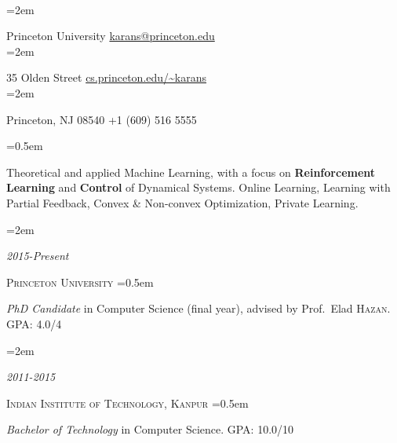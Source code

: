 \documentclass{scrartcl}
\date{}
\newlength{\datebox}\settowidth{\datebox}{Spring 2011} %
\newcommand{\NewEntry}[3]{\noindent\hangindent=2em\hangafter=0 \parbox{\datebox}{\small \textit{#1}}\hspace{1.5em} #2 #3 %
\vspace{0.5em}} %
\newcommand{\Description}[1]{\hangindent=0.5em\hangafter=0\noindent\raggedright\footnotesize{#1}\par\normalsize\vspace{1em}} %
\newcommand{\IndentLine}{\hangindent=2em\hangafter=0\noindent\raggedright}
\begin{document}
\thispagestyle{empty} %

\begin{cv}{}\vspace{1.0em} %

\hspace{-3.0em}\noindent{}
{\small
\\ %
{\IndentLine Princeton University \hfill \Letter\href{mailto:karans@princeton.edu}{karans@princeton.edu}\\ \IndentLine 35 Olden Street \hfill \Mundus\href{http://cs.princeton.edu/~karans}{cs.princeton.edu/\textasciitilde karans} \\
\IndentLine Princeton, NJ 08540 \hfill \Mobilefone +1 (609) 516 5555\\}}

\vspace{0.7em} 

\noindent{}

\Description{Theoretical and applied Machine Learning, with a focus on \textbf {Reinforcement Learning} and \textbf{Control} of Dynamical Systems. Online Learning, Learning with Partial Feedback, Convex \& Non-convex Optimization, Private Learning. }



\NewEntry{2015-Present}{\textsc{\color{Maroon} Princeton University}}

\vspace{-0.4em}\hspace{1.0em}
\Description{\textit{PhD Candidate} in Computer Science (final year), advised by Prof.~Elad \textsc{Hazan}. \hfill GPA: 4.0/4
}

\vspace{-0.5em}
\NewEntry{2011-2015}{\textsc{\color{Maroon} Indian Institute of Technology, Kanpur}}

\vspace{-0.4em}\hspace{1.0em}
\Description{\textit{Bachelor of Technology} in Computer Science. \hfill GPA: 10.0/10
}


\end{cv}
\end{document}
